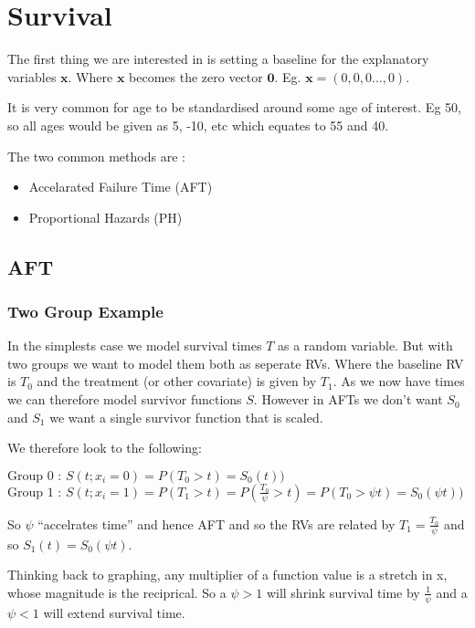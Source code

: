 \documentclass[
  letterpaper,
  DIV=11,
  numbers=noendperiod]{scrreprt}
\providecommand{\tightlist}{%
  \setlength{\itemsep}{0pt}\setlength{\parskip}{0pt}}\usepackage{longtable,booktabs,array}
\begin{document}

\hypertarget{survival-1}{%
\chapter{Survival}\label{survival-1}}

The first thing we are interested in is setting a baseline for the
explanatory variables \(\textbf{x}\). Where \(\textbf{x}\) becomes the
zero vector \(\textbf{0}\). Eg. \(\textbf{x} = (0,0,0...,0)\).

It is very common for age to be standardised around some age of
interest. Eg 50, so all ages would be given as 5, -10, etc which equates
to 55 and 40.

The two common methods are :

\begin{itemize}
\tightlist
\item
  Accelarated Failure Time (AFT)
\item
  Proportional Hazards (PH)
\end{itemize}

\hypertarget{aft}{%
\section{AFT}\label{aft}}

\hypertarget{two-group-example}{%
\subsection{Two Group Example}\label{two-group-example}}

In the simplests case we model survival times \(T\) as a random
variable. But with two groups we want to model them both as seperate
RVs. Where the baseline RV is \(T_0\) and the treatment (or other
covariate) is given by \(T_1\). As we now have times we can therefore
model survivor functions \(S\). However in AFTs we don't want \(S_0\)
and \(S_1\) we want a single survivor function that is scaled.

We therefore look to the following:

\(\text{Group 0 :   } S(t ; x_i=0) = P(T_0>t) = S_0(t))\)
\(\text{Group 1 :   } S(t ; x_i=1) = P(T_1>t) = P(\frac{T_0}{\psi}> t) = P(T_0>\psi t) = S_0(\psi t))\)

So \(\psi\) ``accelrates time'' and hence AFT and so the RVs are related
by \(T_1 = \frac{T_0}{\psi}\) and so \(S_1(t) = S_0(\psi t)\).

Thinking back to graphing, any multiplier of a function value is a
stretch in x, whose magnitude is the reciprical. So a \(\psi >1\) will
shrink survival time by \(\frac{1}{\psi}\) and a \(\psi <1\) will extend
survival time.
\end{document}
